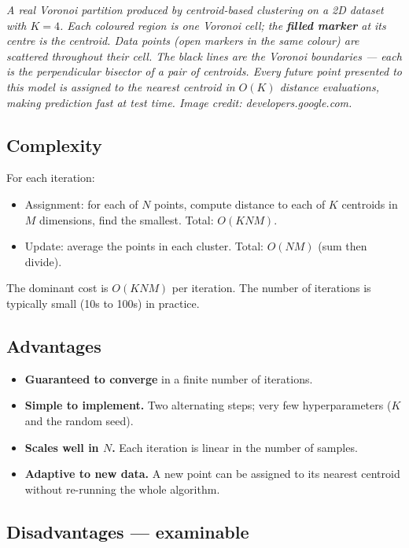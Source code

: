 \documentclass[11pt, a4paper]{article}
\begin{document}
\begin{center}

\footnotesize\textit{A real Voronoi partition produced by centroid-based clustering on a 2D dataset with $K=4$. Each coloured region is one Voronoi cell; the \textbf{filled marker} at its centre is the centroid. Data points (open markers in the same colour) are scattered throughout their cell. The black lines are the Voronoi boundaries --- each is the perpendicular bisector of a pair of centroids. Every future point presented to this model is assigned to the nearest centroid in $O(K)$ distance evaluations, making prediction fast at test time. Image credit: developers.google.com.}
\end{center}

\subsection{Complexity}

For each iteration:
\begin{itemize}
  \item Assignment: for each of $N$ points, compute distance to each of $K$ centroids in $M$ dimensions, find the smallest. Total: $O(KNM)$.
  \item Update: average the points in each cluster. Total: $O(NM)$ (sum then divide).
\end{itemize}
The dominant cost is $O(KNM)$ per iteration. The number of iterations is typically small (10s to 100s) in practice.

\subsection{Advantages}

\begin{itemize}
  \item \textbf{Guaranteed to converge} in a finite number of iterations.
  \item \textbf{Simple to implement.} Two alternating steps; very few hyperparameters ($K$ and the random seed).
  \item \textbf{Scales well in $N$.} Each iteration is linear in the number of samples.
  \item \textbf{Adaptive to new data.} A new point can be assigned to its nearest centroid without re-running the whole algorithm.
\end{itemize}

\subsection{Disadvantages — examinable}
\end{document}
